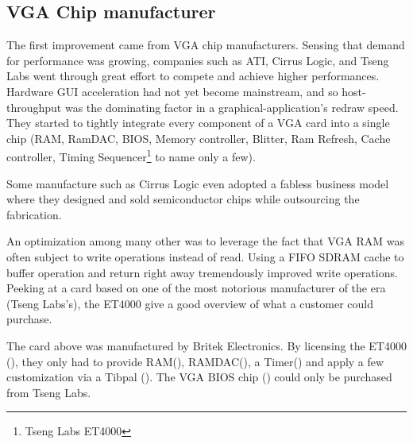 \subsection{VGA Chip manufacturer}
The first improvement came from VGA chip manufacturers. Sensing that demand for performance was growing, companies such as ATI, Cirrus Logic, and Tseng Labs went through great effort to compete and achieve higher performances. Hardware GUI acceleration had not yet become mainstream, and so host-throughput was the dominating factor in a graphical-application's redraw speed. They started to tightly integrate every component of a VGA card into a single chip (RAM, RamDAC, BIOS, Memory controller, Blitter, Ram Refresh, Cache controller, Timing Sequencer\footnote{Tseng Labs ET4000} to name only a few).\\
\par
Some manufacture such as Cirrus Logic even adopted a fabless business model where they designed and sold semiconductor chips while outsourcing the fabrication.\\
\par
An optimization among many other was to leverage the fact that VGA RAM was often subject to write operations instead of read. Using a FIFO SDRAM cache to buffer operation and return right away tremendously improved write operations. Peeking at a card based on one of the most notorious manufacturer of the era (Tseng Labs's), the ET4000 give a good overview of what a customer could purchase.\\ 
\par
{}
\par
The card above was manufactured by Britek Electronics. By licensing the ET4000 (), they only had to provide RAM(), RAMDAC(), a Timer() and apply a few customization via a Tibpal (). The VGA BIOS chip () could only be purchased from Tseng Labs.\\
\par
{}

\par




